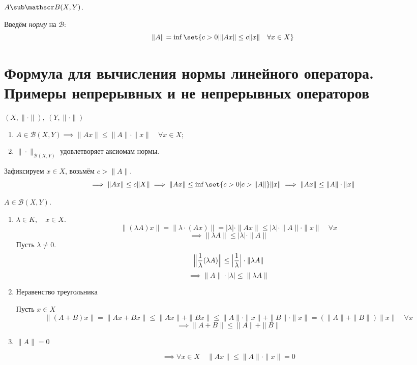 \begin{definition}
	$ A \sub \mathscr B(X, Y) $.

	Введём \emph{норму} на $ \mathscr B $:
	$$ \|A\| = \inf\set{c > 0 | \|Ax\| \le c\|x\| \quad \forall x \in X} $$
\end{definition}

\section{Формула для вычисления нормы линейного оператора.
Примеры непрерывных и не непрерывных операторов}

\begin{statement}
	$ (X, \|\cdot\|), ~ (Y, \|\cdot\|) $

	\begin{enumerate}
		\item $ A \in \mathscr B(X, Y) \implies \|Ax\| \le \|A\| \cdot \|x\| \quad \forall x \in X $;
		\item $ \|\cdot\|_{\mathscr B(X, Y)} $ удовлетворяет аксиомам нормы.
	\end{enumerate}
\end{statement}

\begin{eproof}
\item Зафиксируем $ x \in X $, возьмём $ c > \|A\| $.
	$$ \implies \|Ax\| \le c\|X\| \implies \|Ax\| \le
	\inf\set{c > 0 | c > \|A\|}\|x\| \implies \|Ax\| \le \|A\| \cdot \|x\| $$
\item $ A \in \mathscr B(X, Y) $.

	\begin{enumerate}
		\item $ \lambda \in K, \quad x \in X $.
			$$ \bigl\| (\lambda A)x \bigr\| = \bigl\|\lambda \cdot (Ax) \bigr\| =
			|\lambda| \cdot \|Ax\| \le |\lambda| \cdot \|A\| \cdot \|x\| \quad \forall x $$
			$$ \implies \|\lambda A\| \le |\lambda| \cdot \|A\| $$
			Пусть $ \lambda \ne 0 $.
			$$ \Bigl\| \frac1\lambda (\lambda A) \Bigr\| \le \Bigl| \frac1\lambda \Bigr| \cdot \|\lambda A\| $$
			$$ \implies \|A\| \cdot |\lambda| \le \|\lambda A\| $$
		\item Неравенство треугольника

			Пусть $ x \in X $
			$$ \|(A + B)x\| =
			\|Ax + Bx\| \le \|Ax\| + \|Bx\| \le \|A\| \cdot \|x\| + \|B\| \cdot \|x\| =
			(\|A\| + \|B\|) \|x\| \quad \forall x $$
			$$ \implies \|A + B\| \le \|A\| + \|B\| $$
		\item $ \|A\| = 0 $

			$$ \implies \forall x \in X \quad \|Ax\| \le \|A\| \cdot \|x\| = 0 $$
	\end{enumerate}
\end{eproof}

